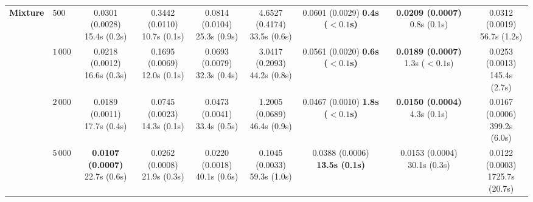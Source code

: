 \begin{table}[htbp]
{\begin{tabular}{llccccccc}
\hline
\textbf{Mixture} & $500$ & \makecell{0.0301 (0.0028) \\ \scriptsize 15.4s (0.2s)} & \makecell{0.3442 (0.0110) \\ \scriptsize 10.7s (0.1s)} & \makecell{0.0814 (0.0104) \\ \scriptsize 25.3s (0.9s)} & \makecell{4.6527 (0.4174) \\ \scriptsize 33.5s (0.6s)} & \makecell{0.0601 (0.0029) \\ \scriptsize \textbf{0.4s ($\boldsymbol{{<}0.1}$s)}} & \makecell{\textbf{0.0209 (0.0007)} \\ \scriptsize 0.8s (0.1s)} & \makecell{0.0312 (0.0019) \\ \scriptsize 56.7s (1.2s)} \\
 & $1{\,}000$ & \makecell{0.0218 (0.0012) \\ \scriptsize 16.6s (0.3s)} & \makecell{0.1695 (0.0069) \\ \scriptsize 12.0s (0.1s)} & \makecell{0.0693 (0.0079) \\ \scriptsize 32.3s (0.4s)} & \makecell{3.0417 (0.2093) \\ \scriptsize 44.2s (0.8s)} & \makecell{0.0561 (0.0020) \\ \scriptsize \textbf{0.6s ($\boldsymbol{{<}0.1}$s)}} & \makecell{\textbf{0.0189 (0.0007)} \\ \scriptsize 1.3s (${<}0.1$s)} & \makecell{0.0253 (0.0013) \\ \scriptsize 145.4s (2.7s)} \\
 & $2{\,}000$ & \makecell{0.0189 (0.0011) \\ \scriptsize 17.7s (0.4s)} & \makecell{0.0745 (0.0023) \\ \scriptsize 14.3s (0.1s)} & \makecell{0.0473 (0.0041) \\ \scriptsize 33.4s (0.5s)} & \makecell{1.2005 (0.0689) \\ \scriptsize 46.4s (0.9s)} & \makecell{0.0467 (0.0010) \\ \scriptsize \textbf{1.8s ($\boldsymbol{{<}0.1}$s)}} & \makecell{\textbf{0.0150 (0.0004)} \\ \scriptsize 4.3s (0.1s)} & \makecell{0.0167 (0.0006) \\ \scriptsize 399.2s (6.0s)} \\
 & $5{\,}000$ & \makecell{\textbf{0.0107 (0.0007)} \\ \scriptsize 22.7s (0.6s)} & \makecell{0.0262 (0.0008) \\ \scriptsize 21.9s (0.3s)} & \makecell{0.0220 (0.0018) \\ \scriptsize 40.1s (0.6s)} & \makecell{0.1045 (0.0033) \\ \scriptsize 59.3s (1.0s)} & \makecell{0.0388 (0.0006) \\ \scriptsize \textbf{13.5s (0.1s)}} & \makecell{0.0153 (0.0004) \\ \scriptsize 30.1s (0.3s)} & \makecell{0.0122 (0.0003) \\ \scriptsize 1725.7s (20.7s)} \\

\end{tabular}}
\end{table}
